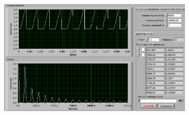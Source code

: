 \begin{figure}[H]
	\centering
	\includegraphics[width=0.85\textwidth]{pic/saw_s.png}
	\caption{}
	
\end{figure}
